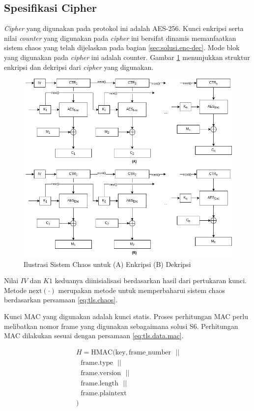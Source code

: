 \subsection{Spesifikasi Cipher}

\emph{Cipher} yang digunakan pada protokol ini adalah AES-256. Kunci enkripsi serta nilai \emph{counter} yang digunakan pada \emph{cipher} ini bersifat dinamis memanfaatkan sistem chaos yang telah dijelaskan pada bagian \ref{sec:solusi.enc-dec}. Mode blok yang digunakan pada \emph{cipher} ini adalah counter. Gambar \ref{fig:tls.cipher} menunjukkan struktur enkripsi dan dekripsi dari \emph{cipher} yang digunakan.

\begin{figure}[!h]
  \centering
  \includegraphics[width=\textwidth]{chapters/res/chapter-3/img/cipher.png}
  \caption{Ilustrasi Sistem Chaos untuk (A) Enkripsi (B) Dekripsi} \label{fig:tls.cipher}
\end{figure}

Nilai $IV$ dan $K1$ keduanya diinisialisasi berdasarkan hasil dari pertukaran kunci. Metode $\text{next}(\cdot)$ merupakan metode untuk memperbaharui sistem chaos berdasarkan persamaan \ref{eq:tls.chaos}.

Kunci MAC yang digunakan adalah kunci statis. Proses perhitungan MAC perlu melibatkan nomor frame yang digunakan sebagaimana solusi S6. Perhitungan MAC dilakukan sesuai dengan persamaan \ref{eq:tls.data.mac}.

\begin{equation}
  \label{eq:tls.data.mac}
  \begin{array}{l}
    H = \text{HMAC}(\text{key}, \text{frame\_number}\text{ }|| \\ 
      \text{   }\text{frame}.\text{type}\text{ }|| \\
      \text{   }\text{frame}.\text{version}\text{ }|| \\ 
      \text{   }\text{frame}.\text{length}\text{ }|| \\
      \text{   }\text{frame}.\text{plaintext} \\
    ) 
  \end{array}
\end{equation}

